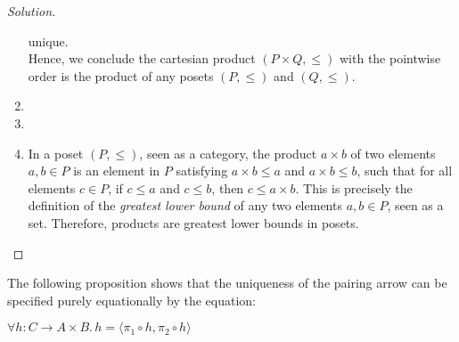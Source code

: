 \documentclass[]{amsbook}
\newcommand{\0}{\mathbf{0}}
\newcommand{\1}{\mathbf{1}}
\newenvironment{solution}
    {\begin{proof}[Solution]}{\end{proof}}
\begin{document}
\begin{solution}
\begin{enumerate}
        unique.\\
        Hence, we conclude the cartesian product $(P \times Q, \le)$ with the
        pointwise order is the product of any posets $(P, \le)$ and $(Q, \le)$.
        \item %
        \item %
        \item In a poset $(P, \le)$, seen as a category, the product $a \times b$
        of two elements $a, b \in P$ is an element in $P$ satisfying $a \times b
        \le a$ and $a \times b \le b$, such that for all elements $c \in P$, if
        $c \le a$ and $c \le b$, then $c \le a \times b$. This is precisely the
        definition of the \emph{greatest lower bound} of any two elements $a, b
        \in P$, seen as a set. Therefore, products are greatest lower bounds in
        posets.
    \end{enumerate}
\end{solution}

The following proposition shows that the uniqueness of the pairing arrow can be
specified purely equationally by the equation:
\begin{center}
    $\forall h: C \to A \times B.\, h = \langle \pi_1 \circ h, \pi_2 \circ h
    \rangle$
\end{center}
\end{document}
